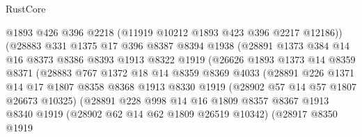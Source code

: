 \begin{lexlean}{RustCore}
\begin{coremodule}
                            @1893
                            @426
                            @396
                            @2218
                            (@11919 @10212 @1893 @423 @396 @2217 @12186))
                          (@28883
                            @331
                            @1375
                            @17
                            @396
                            @8387
                            @8394
                            @1938
                            (@28891
                              @1373
                              @384
                              @14
                              @16
                              @8373
                              @8386
                              @8393
                              @1913
                              @8322
                              @1919
                              (@26626
                                @1893
                                @1373
                                @14
                                @8359
                                @8371
                                (@28883
                                  @767
                                  @1372
                                  @18
                                  @14
                                  @8359
                                  @8369
                                  @4033
                                  (@28891
                                    @226
                                    @1371
                                    @14
                                    @17
                                    @1807
                                    @8358
                                    @8368
                                    @1913
                                    @8330
                                    @1919
                                    (@28902 @57 @14 @57 @1807 @26673 @10325)
                                    (@28891
                                      @228
                                      @998
                                      @14
                                      @16
                                      @1809
                                      @8357
                                      @8367
                                      @1913
                                      @8340
                                      @1919
                                      (@28902 @62 @14 @62 @1809 @26519 @10342)
                                      (@28917
                                        @8350
                                        @1919

\end{coremodule}
\end{lexlean}
